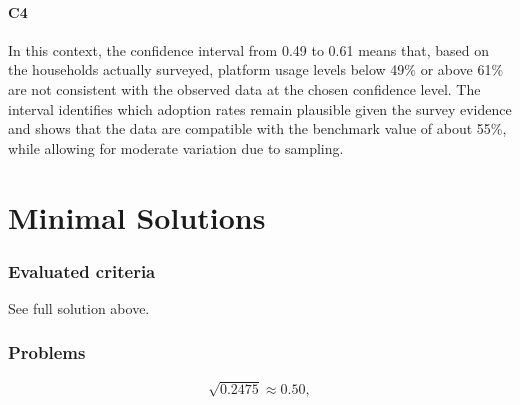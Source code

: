 \begin{ExamProblems}
		\subsection*{C4}
		In this context, the confidence interval from 0.49 to 0.61 means that, based on the households actually surveyed, platform usage levels below 49\% or above 61\% are not consistent with the observed data at the chosen confidence level. The interval identifies which adoption rates remain plausible given the survey evidence and shows that the data are compatible with the benchmark value of about 55\%, while allowing for moderate variation due to sampling.
		
	\end{ExamProblems}


\part{Minimal Solutions}

\section*{Evaluated criteria}
See full solution above.

\section*{Problems}
\[\sqrt{0.2475} \approx 0.50,\]


